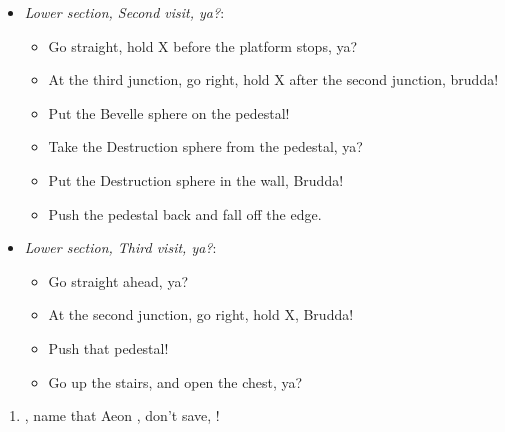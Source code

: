\begin{trial}
\begin{itemize}
\item \textit{Lower section, Second visit, ya?}:
\begin{itemize}
\item Go straight, hold X before the platform stops, ya?
\item At the third junction, go right, hold X after the second junction, brudda!
\item Put the Bevelle sphere on the pedestal!
\item Take the Destruction sphere from the pedestal, ya?
\item Put the Destruction sphere in the wall, Brudda!
\item Push the pedestal back and fall off the edge.
\end{itemize}
\item \textit{Lower section, Third visit, ya?}:
\begin{itemize}
\item Go straight ahead, ya?
\item At the second junction, go right, hold X, Brudda!
\item Push that pedestal!
\item Go up the stairs, and open the chest, ya?
\end{itemize}
\end{itemize}
\end{trial}
\begin{enumerate}[resume]
\item \sd, name that Aeon \bahamut, don't save, \sd!
\end{enumerate}
\wincb\lossnp\bothnp\winnpsingle\lossnpsingle\bothnpsingle